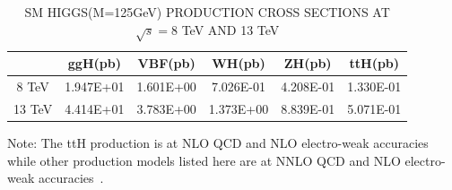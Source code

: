 \begin{table}[htp!]
\begin{threeparttable}
\caption{SM HIGGS(M=125GeV) PRODUCTION CROSS SECTIONS AT $\sqrt{s}=8$ TeV AND 13 TeV}
\begin{center}
\begin{tabular}{|c|c|c|c|c|c|}\hline
           & ggH(pb)             &  VBF(pb)      &   WH(pb)      &   ZH(pb)          & ttH(pb)\\\hline
8 TeV  &  1.947E+01       & 1.601E+00    &  7.026E-01  &   4.208E-01    & 1.330E-01      \\\hline
13 TeV &   4.414E+01      &  3.783E+00   &  1.373E+00 &   8.839E-01    &  5.071E-01     \\\hline
\end{tabular}
\begin{tablenotes}
\small
\item  Note: The ttH production is at NLO QCD and NLO electro-weak accuracies while other production models listed here are at NNLO QCD and NLO electro-weak accuracies~\cite{Yellow_report}.
\end{tablenotes}


\end{center}
\end{threeparttable}
\label{cross_section_numbers}
\end{table}

